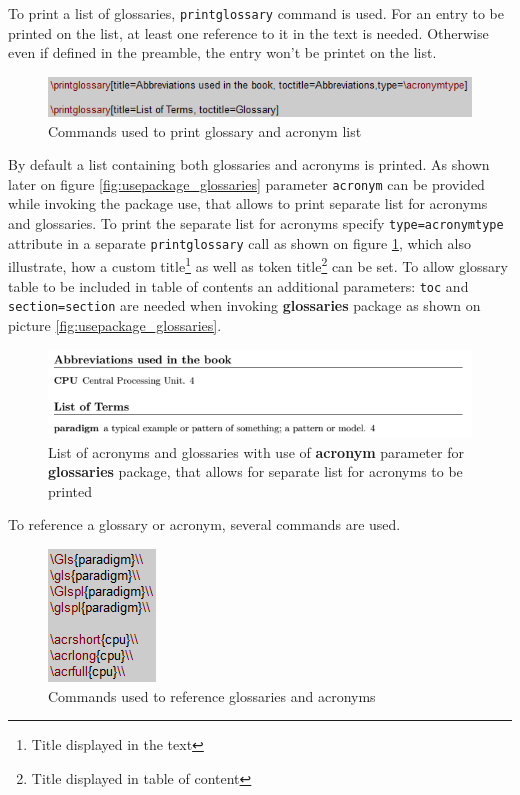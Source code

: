To print a list of glossaries, \texttt{\bs printglossary} command is used. For an entry to be printed on the list, at least one reference to it in the text is needed. Otherwise even if defined in the preamble, the entry won't be printet on the list.

\begin{figure}[H]
\centering
\includegraphics[scale=1.0]{content/LaTeX/figures/printglossary.png}
\caption{Commands used to print glossary and acronym list}
\label{fig:printglossary}
\end{figure}

By default a list containing both glossaries and acronyms is printed. As shown later on figure \ref{fig:usepackage_glossaries} parameter \texttt{acronym} can be provided while invoking the package use, that allows to print separate list for acronyms and glossaries. To print the separate list for acronyms specify \texttt{type=\bs acronymtype} attribute in a separate \texttt{\bs printglossary} call as shown on figure \ref{fig:printglossary}, which also illustrate, how a custom title\footnote{Title displayed in the text} as well as token title\footnote{Title displayed in table of content} can be set. To allow glossary table to be included in table of contents an additional parameters: \texttt{toc} and \texttt{section=section} are needed when invoking \textbf{glossaries} package as shown on picture \ref{fig:usepackage_glossaries}.

\begin{figure}[H]
\centering
\includegraphics[scale=0.8]{content/LaTeX/figures/glossary_types.png}
\caption{List of acronyms and glossaries with use of \textbf{acronym} parameter for \textbf{glossaries} package, that allows for separate list for acronyms to be printed}
\end{figure}

To reference a glossary or acronym, several commands are used.

\begin{figure}[H]
\centering
\includegraphics[scale=1.0]{content/LaTeX/figures/reference_glossaries.png}
\caption{Commands used to reference glossaries and acronyms}
\end{figure}

